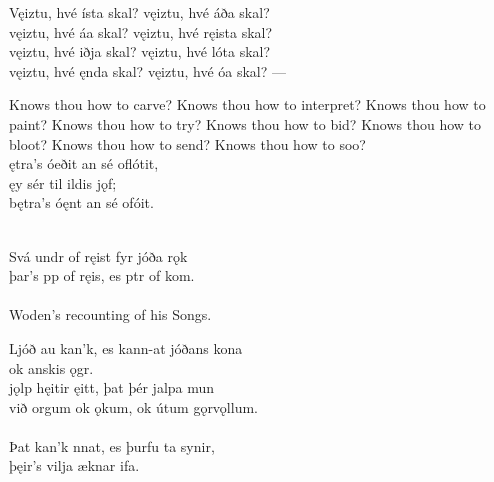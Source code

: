 \bva Vęiztu, hvé ísta skal? \hld vęiztu, hvé áða skal? \\%
vęiztu, hvé áa skal? \hld vęiztu, hvé ręista skal? \\%
vęiztu, hvé iðja skal? \hld vęiztu, hvé lóta skal? \\%
vęiztu, hvé ęnda skal? \hld vęiztu, hvé óa skal? —\footnotemark[5]\\%

\bvb Knows thou how to carve? Knows thou how to interpret? Knows thou how to paint? Knows thou how to try? Knows thou how to bid? Knows thou how to bloot? Knows thou how to send? Knows thou how to soo? \\

\bva {}ętra's óeðit \hld an sé oflótit, \\%
\ind ęy sér til ildis jǫf; \\%
bętra's óęnt \hld an sé ofóit.\footnotemark[6]\\%

 \\

\bva Svá undr of ręist \hld fyr jóða rǫk \\%
þar's pp of ręis, \hld es ptr of kom.\\%

 \\

	Woden's recounting of his Songs.

\bva Ljóð au kan'k, \hld es kann-at jóðans kona \\%
\ind ok anskis ǫgr. \\%
jǫlp hęitir ęitt, \hld þat þér jalpa mun \\%
\ind við orgum ok ǫkum, \hld ok útum gǫrvǫllum.\\%

 \\

\bva Þat kan'k nnat, \hld es þurfu ta synir,\footnotemark[10] \\%
\ind þęir's vilja æknar ifa.\\%

